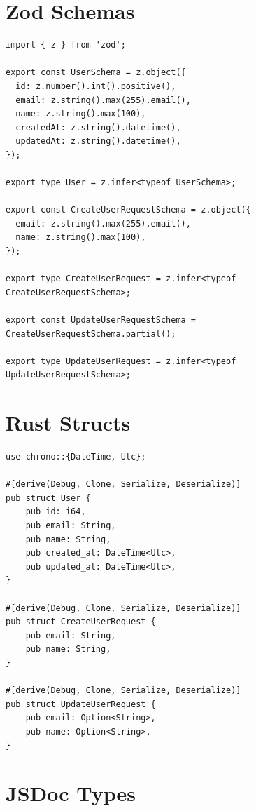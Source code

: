 \section{Zod Schemas}

\begin{verbatim}
import { z } from 'zod';

export const UserSchema = z.object({
  id: z.number().int().positive(),
  email: z.string().max(255).email(),
  name: z.string().max(100),
  createdAt: z.string().datetime(),
  updatedAt: z.string().datetime(),
});

export type User = z.infer<typeof UserSchema>;

export const CreateUserRequestSchema = z.object({
  email: z.string().max(255).email(),
  name: z.string().max(100),
});

export type CreateUserRequest = z.infer<typeof CreateUserRequestSchema>;

export const UpdateUserRequestSchema = CreateUserRequestSchema.partial();

export type UpdateUserRequest = z.infer<typeof UpdateUserRequestSchema>;
\end{verbatim}

\section{Rust Structs}

\begin{verbatim}
use chrono::{DateTime, Utc};

#[derive(Debug, Clone, Serialize, Deserialize)]
pub struct User {
    pub id: i64,
    pub email: String,
    pub name: String,
    pub created_at: DateTime<Utc>,
    pub updated_at: DateTime<Utc>,
}

#[derive(Debug, Clone, Serialize, Deserialize)]
pub struct CreateUserRequest {
    pub email: String,
    pub name: String,
}

#[derive(Debug, Clone, Serialize, Deserialize)]
pub struct UpdateUserRequest {
    pub email: Option<String>,
    pub name: Option<String>,
}
\end{verbatim}

\section{JSDoc Types}


